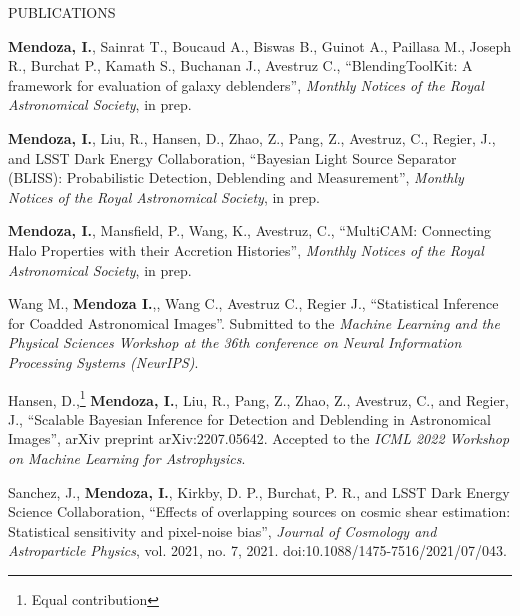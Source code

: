 \begin{rSection}{PUBLICATIONS}
%
\vspace*{-1em}

\item \textbf{Mendoza, I.}, Sainrat T., Boucaud A., Biswas B., Guinot A., Paillasa M., Joseph R., Burchat P., Kamath S., Buchanan J., Avestruz C., ``BlendingToolKit:  A framework for evaluation of galaxy deblenders'', \textit{Monthly Notices of the Royal Astronomical Society}, in prep.

\item \textbf{Mendoza, I.}, Liu, R., Hansen, D., Zhao, Z., Pang, Z., Avestruz, C., Regier, J., and LSST Dark Energy Collaboration, ``Bayesian Light Source Separator (BLISS): Probabilistic Detection, Deblending and Measurement'', \textit{Monthly Notices of the Royal Astronomical Society}, in prep.

\item \textbf{Mendoza, I.}, Mansfield, P., Wang, K., Avestruz, C., ``MultiCAM: Connecting Halo Properties with their Accretion Histories'', \textit{Monthly Notices of the Royal Astronomical Society}, in prep.

\item Wang M., \textbf{Mendoza I.},, Wang C., Avestruz C., Regier J., ``Statistical Inference for Coadded Astronomical Images''. Submitted to the \textit{Machine Learning and the Physical Sciences Workshop at the 36th conference on Neural Information Processing Systems (NeurIPS)}.

\item Hansen, D.,\footnote[1]{\label{ft:equal} Equal contribution} \textbf{Mendoza, I.}, Liu, R., Pang, Z., Zhao, Z., Avestruz, C., and Regier, J., ``Scalable Bayesian Inference for Detection and Deblending in Astronomical Images'', arXiv preprint arXiv:2207.05642. Accepted to the \textit{ICML 2022 Workshop on Machine Learning for Astrophysics}.

\item Sanchez, J., \textbf{Mendoza, I.}, Kirkby, D. P., Burchat, P. R., and LSST Dark Energy Science Collaboration, “Effects of overlapping sources on cosmic shear estimation: Statistical sensitivity and pixel-noise bias”, \textit{Journal of Cosmology and Astroparticle Physics}, vol. 2021, no. 7, 2021. doi:10.1088/1475-7516/2021/07/043.
\end{rSection}

